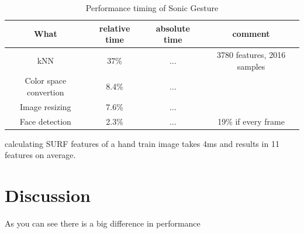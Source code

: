 \begin{table}
\centering
\begin{tabular}{cccc}
What & relative time & absolute time & comment \\
\hline
kNN & 37\% & ... & 3780 features, 2016 samples \\
Color space convertion & 8.4\% & ... & \\
Image resizing & 7.6\% & ... & \\
Face detection & 2.3\% & ... &  19\% if every frame \\
\end{tabular}
\caption{Performance timing of Sonic Gesture}
\end{table}

calculating SURF features of a hand train image takes 4ms and results in 11 features on average.


\section{Discussion}
As you can see there is a big difference in performance



